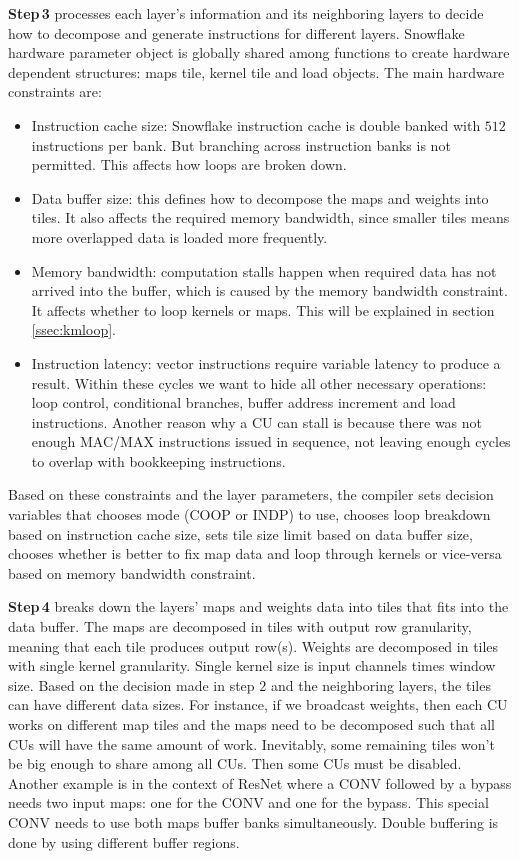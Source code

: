 \documentclass{sig-alternate}
\begin{document}
\textbf{Step\,3} processes each layer's information and its neighboring layers to decide how to decompose and generate instructions for different layers. Snowflake hardware parameter object is globally shared among functions to create hardware dependent structures: maps tile, kernel tile and load objects. The main hardware constraints are: 
\begin{itemize}
\item Instruction cache size: Snowflake instruction cache is double banked with $512$ instructions per bank. But branching across instruction banks is not permitted. This affects how loops are broken down.

\item Data buffer size: this defines how to decompose the maps and weights into tiles. It also affects the required memory bandwidth, since smaller tiles means more overlapped data is loaded more frequently.

\item Memory bandwidth: computation stalls happen when required data has not arrived into the buffer, which is caused by the memory bandwidth constraint. It affects whether to loop kernels or maps. This will be explained in section \ref{ssec:kmloop}.

\item Instruction latency: vector instructions require variable latency to produce a result. Within these cycles we want to hide all other necessary operations: loop control, conditional branches, buffer address increment and load instructions. Another reason why a CU can stall is because there was not enough MAC/MAX instructions issued in sequence, not leaving enough cycles to overlap with bookkeeping instructions. 
\end{itemize}

Based on these constraints and the layer parameters, the compiler sets decision variables that chooses mode (COOP or INDP) to use, chooses loop breakdown based on instruction cache size, sets tile size limit based on data buffer size, chooses whether is better to fix map data and loop through kernels or vice-versa based on memory bandwidth constraint. 

\textbf{Step\,4} breaks down the layers' maps and weights data into tiles that fits into the data buffer. The maps are decomposed in tiles with output row granularity, meaning that each tile produces output row(s). Weights are decomposed in tiles with single kernel granularity. Single kernel size is input channels times window size. Based on the decision made in step $2$ and the neighboring layers, the tiles can have different data sizes. For instance, if we broadcast weights, then each CU works on different map tiles and the maps need to be decomposed such that all CUs will have the same amount of work. Inevitably, some remaining tiles won't be big enough to share among all CUs. Then some CUs must be disabled. Another example is in the context of ResNet where a CONV followed by a bypass needs two input maps: one for the CONV and one for the bypass. This special CONV needs to use both maps buffer banks simultaneously. Double buffering is done by using different buffer regions.
\end{document}
